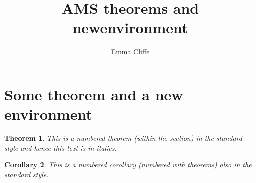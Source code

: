 \usepackage[mathscr]{eucal}
\usepackage{eufrak} 
\usepackage{longtable} 
\usepackage{spverbatim} 
\usepackage{url} 
\newtheorem{theorem}{Theorem}[section]
\newtheorem{corollary}[theorem]{Corollary}
\theoremstyle{definition}
\newtheorem{definition}{Definition}[section]
\theoremstyle{remark}
\newtheorem*{note}{Note}
\newenvironment{ProofOri}{\noindent{\bf Proof.}\hspace*{1em}}{\qed\par}

\title{AMS theorems and newenvironment}
\author{Emma Cliffe}
\date{}
\pagestyle{headings}
\usepackage{calc}
\usepackage{longtable}
\usepackage{tabu}
\usepackage{breqn}
\setlength{\arraycolsep}{0.800000em}
\renewcommand{\arraystretch}{1.400000}

\renewcommand{\baselinestretch}{1.250000}
\selectfont
\setlength{\parskip}{1.0\baselineskip}


\maketitle

\section{Some theorem and a new environment}

\begin{theorem}
This is a numbered theorem (within the section) in the standard style and hence this text is in italics. 
\end{theorem}

\begin{corollary}
This is a numbered corollary (numbered with theorems) also in the standard style.
\end{corollary}

